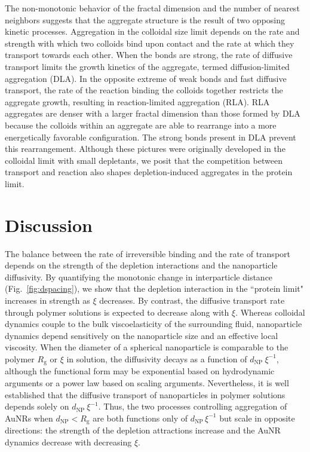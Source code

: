 \documentclass[journal=jacsat, superscriptaddress]{achemso}
\begin{document}
The non-monotonic behavior of the fractal dimension and the number of nearest neighbors suggests that the aggregate structure is the result of two opposing kinetic processes. Aggregation in the colloidal size limit depends on the rate and strength with which two colloids bind upon contact and the rate at which they transport towards each other.\cite{Weitz1985,Lin1989} When the bonds are strong, the rate of diffusive transport limits the growth kinetics of the aggregate, termed diffusion-limited aggregation (DLA).\cite{Witten1981} In the opposite extreme of weak bonds and fast diffusive transport, the rate of the reaction binding the colloids together restricts the aggregate growth, resulting in reaction-limited aggregation (RLA).\cite{Ball1987} RLA aggregates are denser with a larger fractal dimension than those formed by DLA because the colloids within an aggregate are able to rearrange into a more energetically favorable configuration. The strong bonds present in DLA prevent this rearrangement. Although these pictures were originally developed in the colloidal limit with small depletants, we posit that the competition between transport and reaction also shapes depletion-induced aggregates in the protein limit.

\section{Discussion}

The balance between the rate of irreversible binding and the rate of transport depends on the strength of the depletion interactions and the nanoparticle diffusivity. By quantifying the monotonic change in interparticle distance (Fig.\ \ref{fig:dspacing}), we show that the depletion interaction in the ``protein limit" increases in strength as $\xi$ decreases. By contrast, the diffusive transport rate through polymer solutions is expected to decrease along with $\xi$. Whereas colloidal dynamics couple to the bulk viscoelasticity of the surrounding fluid,\cite{Squires2010} nanoparticle dynamics depend sensitively on the nanoparticle size and an effective local viscosity.\cite{Cai2011,Poling-Skutvik2015} When the diameter of a spherical nanoparticle is comparable to the polymer $R_\mathrm{g}$ or $\xi$ in solution, the diffusivity decays as a function of $d_\mathrm{NP}\: \xi^{-1}$, although the functional form may be exponential based on hydrodynamic arguments\cite{Cukier1984,Phillies1985,Cheng2002} or a power law based on scaling arguments.\cite{Cai2011} Nevertheless, it is well established that the diffusive transport of nanoparticles in polymer solutions depends solely on $d_\mathrm{NP}\: \xi^{-1}$. Thus, the two processes controlling aggregation of AuNRs when $d_\mathrm{NP} < R_\mathrm{g}$ are both functions only of $d_\mathrm{NP}\, \xi^{-1}$ but scale in opposite directions: the strength of the depletion attractions increase and the AuNR dynamics decrease with decreasing $\xi$. 
\end{document}
